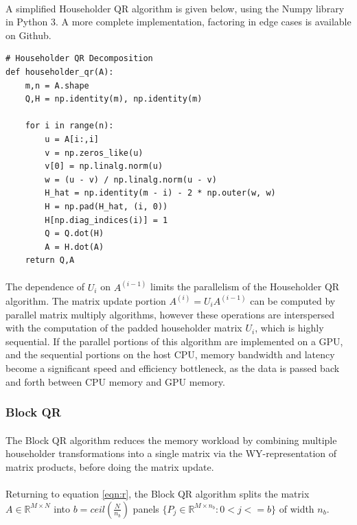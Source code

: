 \documentclass{article}
\begin{document}
\paragraph{}
A simplified Householder QR algorithm is given below, using the Numpy library in Python 3. A more complete implementation, factoring in edge cases is available on Github.

\begin{lstlisting}
# Householder QR Decomposition
def householder_qr(A):
    m,n = A.shape
    Q,H = np.identity(m), np.identity(m)

    for i in range(n):
        u = A[i:,i]
        v = np.zeros_like(u)
        v[0] = np.linalg.norm(u)
        w = (u - v) / np.linalg.norm(u - v)
        H_hat = np.identity(m - i) - 2 * np.outer(w, w)
        H = np.pad(H_hat, (i, 0))
        H[np.diag_indices(i)] = 1
        Q = Q.dot(H)
        A = H.dot(A)
    return Q,A
\end{lstlisting}

\paragraph{}
The dependence of $U_i$ on $A^{(i-1)}$ limits the parallelism of the Householder QR algorithm. The matrix update portion $A^{(i)} = U_iA^{(i-1)}$ can be computed by parallel matrix multiply algorithms, however these operations are interspersed with the computation of the padded householder matrix $U_i$, which is highly sequential. If the parallel portions of this algorithm are implemented on a GPU, and the sequential portions on the host CPU, memory bandwidth and latency become a significant speed and efficiency bottleneck, as the data is passed back and forth between CPU memory and GPU memory.

\subsubsection{Block QR}
\paragraph{}
 The Block QR algorithm reduces the memory workload by combining multiple householder transformations into a single matrix via the WY-representation of matrix products, before doing the matrix update.

\paragraph{}
Returning to equation \eqref{eqn:r}, the Block QR algorithm splits the matrix $A \in\mathbb{R}^{M\times{}N}$ into $b = ceil(\frac{N}{n_b})$ panels $\{P_j \in \mathbb{R}^{M\times{}n_b} : 0 < j <= b\}$ of width $n_b$.
\end{document}
